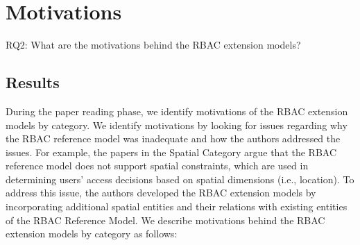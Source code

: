 \section{Motivations} \label{sec:motivations}

RQ2: What are the motivations behind the RBAC extension models?

\subsection{Results}

During the paper reading phase, we identify motivations of the RBAC extension models by category. We identify motivations by looking for issues regarding why the RBAC reference model was inadequate and how the authors addressed the issues. For example, the papers in the Spatial Category argue that the RBAC reference model does not support spatial constraints, which are used in determining users' access decisions based on spatial dimensions (i.e., location). To address this issue, the authors developed the RBAC extension models by incorporating additional spatial entities and their relations with existing entities of the RBAC Reference Model. We describe motivations behind the RBAC extension models by category as follows:


